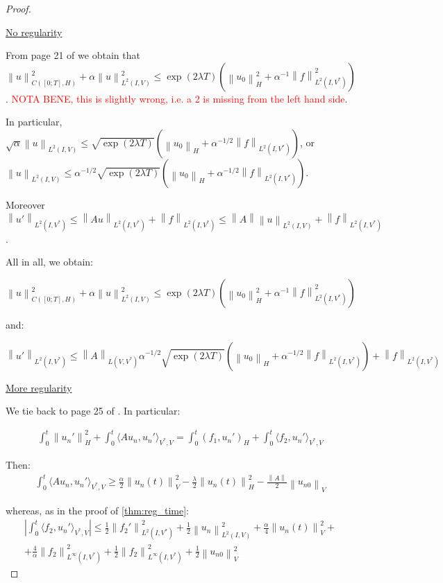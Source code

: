 \documentclass[english,a4paper,10pt,oneside]{scrbook}	%
\theoremstyle{break}
\newenvironment{mproof}[1][\proofname]{%
  \begin{proof}[#1]$ $\par\nobreak\ignorespaces
}{%
  \end{proof}
}
\renewcommand*{\proofname}{Proof}
\theoremstyle{remark}
\newcommand{\norm}[1]{\left\lVert#1\right\rVert}
\newcommand{\HN}[1]{\norm{#1}_{H}}
\newcommand{\VN}[1]{\norm{#1}_{V}}
\begin{document}
\begin{mproof}

\underline{No regularity}

From page 21 of \cite{gilardi} we obtain that $\norm{u}^2_{C([0;T],H)}+\alpha\norm{u}_{L^2(I,V)}^2\leq \exp(2\lambda T)(\HN{u_0}^2+\alpha^{-1}\norm{f}^2_{L^2(I,V^*)})$. \textcolor{red}{NOTA BENE, this is slightly wrong, i.e. a 2 is missing from the left hand side}.

In particular, $\sqrt{\alpha}\norm{u}_{L^2(I,V)}\leq 	\sqrt{\exp(2\lambda T)}(\HN{u_0}+\alpha^{-1/2}\norm{f}_{L^2(I,V^*)})$, or $\norm{u}_{L^2(I,V)}\leq 	\alpha^{-1/2}\sqrt{\exp(2\lambda T)}(\HN{u_0}+\alpha^{-1/2}\norm{f}_{L^2(I,V^*)})$.

Moreover $\norm{u'}_{L^2(I,V^*)}\leq \norm{Au}_{L^2(I,V^*)}+\norm{f}_{L^2(I,V^*)}\leq \norm{A}\norm{u}_{L^2(I,V)}+\norm{f}_{L^2(I,V^*)}$.

All in all, we obtain:

$$\norm{u}^2_{C([0;T],H)}+\alpha\norm{u}_{L^2(I,V)}^2\leq \exp(2\lambda T)(\HN{u_0}^2+\alpha^{-1}\norm{f}^2_{L^2(I,V^*)})$$

and:

$$\norm{u'}_{L^2(I,V^*)}\leq \norm{A}_{L(V,V^*)}	\alpha^{-1/2}\sqrt{\exp(2\lambda T)}(\HN{u_0}+\alpha^{-1/2}\norm{f}_{L^2(I,V^*)})+\norm{f}_{L^2(I,V^*)}$$

\underline{More regularity}

We tie back to page 25 of \cite{gilardi}. In particular:

\begin{align*}
\int_0^t\HN{u_n'}^2+\int_0^t\langle A u_n, u_n'\rangle_{V^*,V}=\int_0^t(f_1,u_n')_H+\int_0^t \langle f_2, u_n'\rangle_{V^*,V}
\end{align*}


Then:
\begin{align*}
\int_0^t\langle A u_n, u_n'\rangle_{V^*,V}\geq \frac{\alpha}{2}\VN{u_n(t)}^2-\frac{\lambda}{2}\HN{u_n(t)}^2-\frac{\norm{A}}{2}\VN{u_{n0}}
\end{align*}

whereas, as in the proof of \cref{thm:reg_time}:
\begin{align*}
	\left | \int_0^t \langle f_2,u_n' \rangle_{V^*,V}\right | \leq
	\frac{1}{2}\norm{f_2'}_{L^2(I,V^*)}^2 + \frac{1}{2}\norm{u_n}_{L^2(I,V)}^2 + \frac{\alpha}{4}\VN{u_n(t)}^2 +\\
	+ \frac{4}{\alpha}\norm{f_2}_{L^\infty(I,V^*)}^2+ \frac{1}{2}\norm{f_2}_{L^\infty(I,V^*)}^2+\frac{1}{2}\VN{u_{n0}}^2
\end{align*}


\end{mproof}
\end{document}
